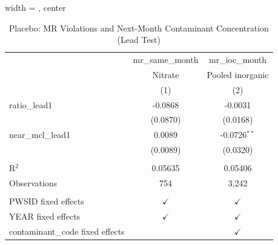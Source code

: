 
\begin{table}[htbp]
   
   \caption{\label{tab:mr_concentration_lag_placebo} Placebo: MR Violations and Next-Month Contaminant Concentration (Lead Test)}
   \bigskip
   
   \centering
   
   \begin{adjustbox}{width = \textwidth, center}
      
      
      \begin{tabular}{lcc}
         \toprule
         
                                          & mr\_same\_month   & mr\_ioc\_month\\    
         
                                          & Nitrate           & Pooled inorganic \\   
         
                                          & (1)               & (2)\\  
         
         \midrule 
         ratio\_lead1                     & -0.0868           & -0.0031\\   
                                          & (0.0870)          & (0.0168)\\   
         near\_mcl\_lead1                 & 0.0089            & -0.0726$^{**}$\\   
                                          & (0.0089)          & (0.0320)\\   
         
          \\
         
         R$^2$                            & 0.05635           & 0.05406\\  
         Observations                     & 754               & 3,242\\  
         
          \\
         
         PWSID fixed effects              & $\checkmark$      & $\checkmark$\\   
         YEAR fixed effects               & $\checkmark$      & $\checkmark$\\   
         contaminant\_code fixed effects  &                   & $\checkmark$\\   
         

\end{tabular}
\end{adjustbox}
\end{table}

